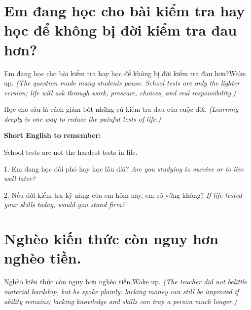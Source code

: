 \section{Em đang học cho bài kiểm tra hay học để không bị đời kiểm tra đau hơn?}
\begin{truyen}{Em đang học cho bài kiểm tra hay học để không bị đời kiểm tra đau hơn?}{Wake up.}
\textit{(The question made many students pause. School tests are only the lighter version; life will ask through work, pressure, choices, and real responsibility.)}
\end{truyen}

\begin{baihoc}
Học cho sâu là cách giảm bớt những cú kiểm tra đau của cuộc đời.
\textit{(Learning deeply is one way to reduce the painful tests of life.)}
\end{baihoc}

\begin{ghinhoanh}
\textbf{Short English to remember:}

School tests are not the hardest tests in life.

\end{ghinhoanh}

\begin{tuhocnhanh}
1. Em đang học đối phó hay học lâu dài? \textit{Are you studying to survive or to live well later?}

2. Nếu đời kiểm tra kỹ năng của em hôm nay, em có vững không? \textit{If life tested your skills today, would you stand firm?}
\end{tuhocnhanh}
\ngancach

\section{Nghèo kiến thức còn nguy hơn nghèo tiền.}
\begin{truyen}{Nghèo kiến thức còn nguy hơn nghèo tiền.}{Wake up.}
\textit{(The teacher did not belittle material hardship, but he spoke plainly: lacking money can still be improved if ability remains; lacking knowledge and skills can trap a person much longer.)}
\end{truyen}

